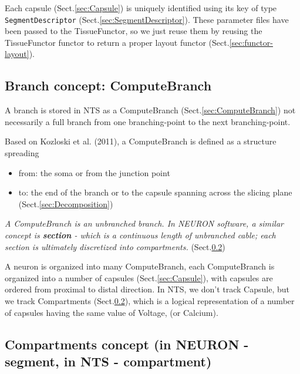 Each capsule (Sect.\ref{sec:Capsule}) is uniquely identified using its
key of type \verb!SegmentDescriptor! (Sect.\ref{sec:SegmentDescriptor}).
% 
These parameter files have been passed to the TissueFunctor, so we just
reuse them by reusing the TissueFunctor functor to return a proper layout functor
(Sect.\ref{sec:functor-layout}).



\subsection{Branch concept: ComputeBranch}

A branch is stored in NTS as a ComputeBranch (Sect.\ref{sec:ComputeBranch})  not
necessarily a full branch from one branching-point to the next branching-point.

Based on Kozloski et al. (2011), a ComputeBranch is defined as a structure
spreading
\begin{itemize}
  \item from: the soma or from the junction point
  \item to: the end of the branch or to the capsule spanning across the slicing
  plane (Sect.\ref{sec:Decomposition})
\end{itemize}

{\it A ComputeBranch is an unbranched branch. In NEURON software, a similar
concept is {\bf section} - which is a continuous length of unbranched
cable; each section is ultimately discretized into compartments.}
(Sect.\ref{sec:compartment-in-neuron})

A neuron is organized into many ComputeBranch, each ComputeBranch is organized
into a number of capsules (Sect.\ref{sec:Capsule}), with capsules are ordered
from proximal to distal direction.
In NTS, we don't track Capsule, but we track Compartments
(Sect.\ref{sec:compartment-in-neuron}), which is a logical representation of a
number of capsules having the same value of Voltage, (or Calcium).

\subsection{Compartments concept (in NEURON - segment, in NTS - compartment)}
\label{sec:compartment-in-neuron}


